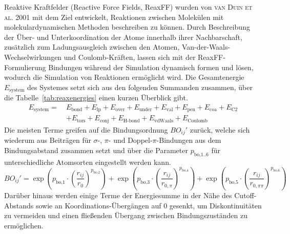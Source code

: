 Reaktive Kraftfelder (Reactive Force Fields, ReaxFF) wurden von \textsc{van Duin et al.}\cite{van_duin_reaxff:_2001} 2001 mit dem Ziel entwickelt, Reaktionen zwischen Molekülen mit molekulardynamischen Methoden beschreiben zu können.
Durch Beschreibung der Über- und Unterkoordination der Atome innerhalb ihrer Nachbarschaft, zusätzlich zum Ladungsausgleich zwischen den Atomen, Van-der-Waals-Wechselwirkungen und Coulomb-Kräften, lassen sich mit der ReaxFF-Formulierung Bindungen während der Simulation dynamisch formen und lösen, wodurch die Simulation von Reaktionen ermöglicht wird.
Die Gesamtenergie $E_\text{system}$ des Systemes setzt sich aus den folgenden Summanden zusammen, über die Tabelle~\ref{tab:reaxenergies} einen kurzen Überblick gibt.
\begin{align}
  \label{reaxformulation}
  E_\text{system} =~& E_\text{bond} + E_\text{lp} + E_\text{over} + E_\text{under} + E_\text{val} + E_\text{pen} + E_\text{coa} + E_\text{C2} \\
  \nonumber  & + E_\text{tors} + E_\text{conj} + E_\text{H-bond} + E_\text{vdWaals} + E_\text{Coulomb}
\end{align}
Die meisten Terme greifen auf die Bindungsordnung $BO_{ij}'$ zurück, welche sich wiederum aus Beiträgen für $\sigma$-, $\pi$- und Doppel-$\pi$-Bindungen aus dem Bindungsabstand zusammen setzt und über die Parameter $p_{\text{bo,1..6}}$ für unterschiedliche Atomsorten eingestellt werden kann.
\begin{equation}
  BO_{ij}' = \exp\left( p_{\text{bo,1}} \cdot \left( \frac{r_{ij}}{r_0} \right)^{p_\text{bo,2}} \right) + \exp\left( p_{\text{bo,3}} \cdot \left( \frac{r_{ij}}{r_{0,\pi}} \right)^{p_\text{bo,4}} \right) + \exp\left( p_{\text{bo,5}} \cdot \left( \frac{r_{ij}}{r_{0,\pi\pi}} \right)^{p_\text{bo,6}} \right)
\end{equation}
Darüber hinaus werden einige Terme der Energiesumme in der Nähe des Cutoff-Abstands sowie an Koordinations-Übergängen auf 0 gesenkt, um Diskontinuitäten zu vermeiden und einen fließenden Übergang zwischen Bindungszuständen zu ermöglichen.

